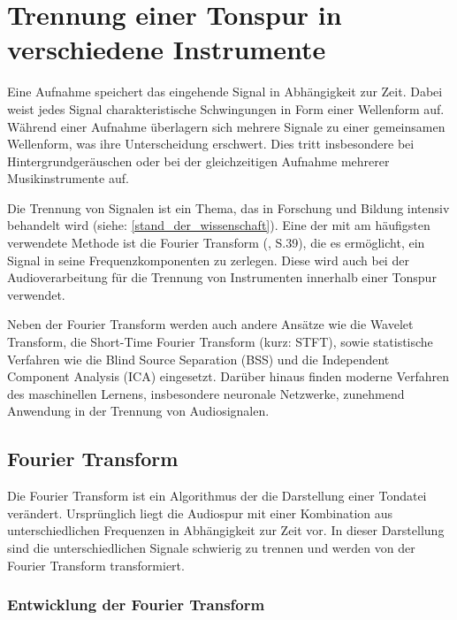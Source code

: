 \parencite{audioformate_im_überblick}

%
\section{Trennung einer Tonspur in verschiedene Instrumente}
%

Eine Aufnahme speichert das eingehende Signal in Abhängigkeit zur Zeit. Dabei weist jedes Signal charakteristische Schwingungen in Form einer Wellenform auf. Während einer Aufnahme überlagern sich mehrere Signale zu einer gemeinsamen Wellenform, was ihre Unterscheidung erschwert. Dies tritt insbesondere bei Hintergrundgeräuschen oder bei der gleichzeitigen Aufnahme mehrerer Musikinstrumente auf.

\par

Die Trennung von Signalen ist ein Thema, das in Forschung und Bildung intensiv behandelt wird (siehe: \cref{stand_der_wissenschaft}). Eine der mit am häufigsten verwendete Methode ist die Fourier Transform (\cite{fundamentals_of_music_processing}, S.39), die es ermöglicht, ein Signal in seine Frequenzkomponenten zu zerlegen. Diese wird auch bei der Audioverarbeitung für die Trennung von Instrumenten innerhalb einer Tonspur verwendet.

\par

Neben der Fourier Transform werden auch andere Ansätze wie die Wavelet Transform, die Short-Time Fourier Transform (kurz: STFT), sowie statistische Verfahren wie die Blind Source Separation (BSS) und die Independent Component Analysis (ICA) eingesetzt. Darüber hinaus finden moderne Verfahren des maschinellen Lernens, insbesondere neuronale Netzwerke, zunehmend Anwendung in der Trennung von Audiosignalen.

%
\subsection{Fourier Transform}
%

Die Fourier Transform ist ein Algorithmus der die Darstellung einer Tondatei verändert. Ursprünglich liegt die Audiospur mit einer Kombination aus unterschiedlichen Frequenzen in Abhängigkeit zur Zeit vor. In dieser Darstellung sind die unterschiedlichen Signale schwierig zu trennen und werden von der Fourier Transform transformiert.

\par

%
\subsubsection{Entwicklung der Fourier Transform}
%

